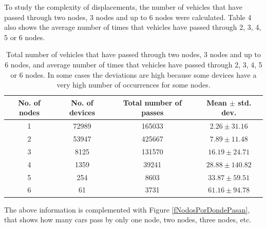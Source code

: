 \documentclass{llncs}
\begin{document}
To study the complexity of displacements, the number of vehicles that have passed through two nodes, 3 nodes and up to 6 nodes  were calculated. 
Table 4 also shows the average number of times that vehicles have passed through 2, 3, 4, 5 or 6 nodes.

 \begin{table}
 \begin{center}
 \begin{tabular}{|c|c|c|c|}
 \hline
 No. of nodes & 	No. of devices & 	Total number of passes & 	Mean $\pm$ std. dev.  \\
 \hline
1 & 	72989 & 	 165033 & 	$2.26 \pm 31.16$  \\
 \hline
2 & 	53947 & 	 425667 & 	$7.89 \pm 11.48$  \\
 \hline
3 & 	8125 & 	 131570 & 	$16.19 \pm 24.71$  \\
 \hline
4 & 	1359 & 	 39241 & 	$28.88 \pm 140.82$  \\
 \hline
5 & 	254 & 	 8603 & 	$33.87 \pm 59.51$  \\
 \hline
6 & 	61 & 	 3731 & 	$61.16 \pm 94.78$  \\
 \hline
 \end{tabular}
 \end{center}
 \caption{Total number of vehicles that have passed through two nodes, 3 nodes and up to 6 nodes, and average number of times that vehicles have passed through 2, 3, 4, 5 or 6 nodes. In some cases the deviations are high because some devices have a very high number of occurrences for some nodes.
 \label{tNodosPorDondePasan}}
 \end{table}

The above information is complemented with Figure \ref{fNodosPorDondePasan}, that shows how many cars pass by only one node, two nodes, three nodes, etc.
\end{document}
